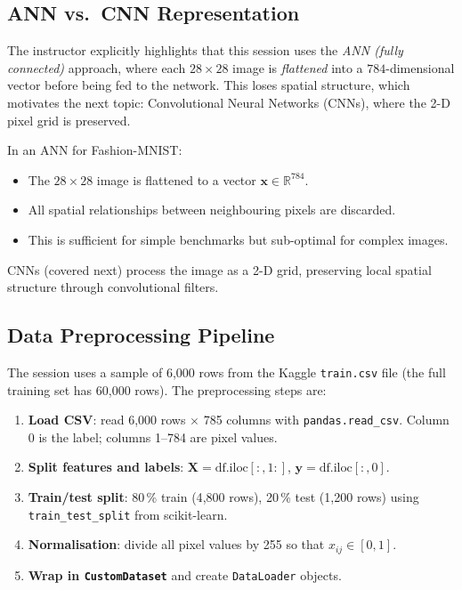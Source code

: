 \documentclass[12pt,a4paper]{article}
\begin{document}
\subsection{ANN vs.\ CNN Representation}
\label{subsec:ann-vs-cnn}

The instructor explicitly highlights that this session uses the \emph{ANN
(fully connected)} approach, where each $28 \times 28$ image is
\emph{flattened} into a $784$-dimensional vector before being fed to the
network.  This loses spatial structure, which motivates the next topic:
Convolutional Neural Networks (CNNs), where the 2-D pixel grid is preserved.

\begin{keyinsight}[title=ANN vs.\ CNN on Image Data]
In an ANN for Fashion-MNIST:
\begin{itemize}
  \item The $28 \times 28$ image is flattened to a vector $\mathbf{x} \in \mathbb{R}^{784}$.
  \item All spatial relationships between neighbouring pixels are discarded.
  \item This is sufficient for simple benchmarks but sub-optimal for complex images.
\end{itemize}
CNNs (covered next) process the image as a 2-D grid, preserving local
spatial structure through convolutional filters.
\end{keyinsight}

\subsection{Data Preprocessing Pipeline}
\label{subsec:preprocessing}

The session uses a sample of 6{,}000 rows from the Kaggle \texttt{train.csv}
file (the full training set has 60{,}000 rows).  The preprocessing steps are:

\begin{enumerate}[label=\arabic*.]
  \item \textbf{Load CSV}: read 6{,}000 rows $\times$ 785 columns with
        \texttt{pandas.read\_csv}.  Column 0 is the label; columns
        1--784 are pixel values.
  \item \textbf{Split features and labels}: $\mathbf{X} = \text{df.iloc}[:,1:]$,
        $\mathbf{y} = \text{df.iloc}[:,0]$.
  \item \textbf{Train/test split}: 80\,\% train (4{,}800 rows),
        20\,\% test (1{,}200 rows) using \texttt{train\_test\_split}
        from scikit-learn.
  \item \textbf{Normalisation}: divide all pixel values by 255 so that
        $x_{ij} \in [0, 1]$.
  \item \textbf{Wrap in \texttt{CustomDataset}} and create
        \texttt{DataLoader} objects.
\end{enumerate}
\end{document}
